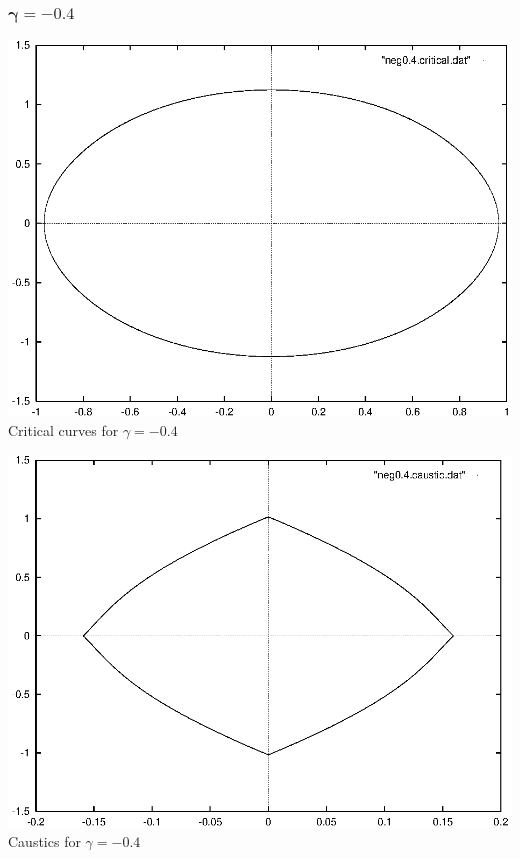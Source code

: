 \documentclass[a4paper]{IEEEtran}
\begin{document}
    \subsubsection{$\mathbf{\gamma = -0.4}$}
    \begin{center}
        \includegraphics[width=\columnwidth]{images/neg0-4-critical.eps} 
        \\[1mm]
        Critical curves for $\gamma = -0.4$
    \end{center}
    \begin{center}
        \includegraphics[width=\columnwidth]{images/neg0-4-caustic.eps} 
        \\[1mm]
        Caustics for $\gamma = -0.4$
    \end{center}
\end{document}
